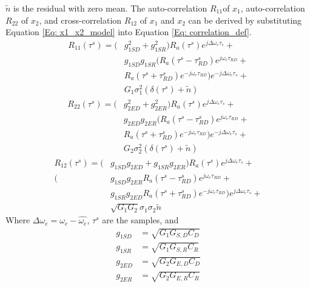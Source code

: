 \documentclass[draftcls,onecolumn]{IEEEtran}  %
\begin{document}
$\tilde{n}$ is the residual with zero mean. The auto-correlation $R_{11}$of $x_1$, auto-correlation $R_{22}$ of $x_2$, and cross-correlation $R_{12}$ of $x_1$ and $x_2$ can be derived by substituting Equation \ref{Eq: x1_x2_model} into Equation \ref{Eq: correlation_def}.
\begin{equation}
\begin{split}
	R_{11}(\tau^s) = (&g^2_{1SD} + g^2_{1SR})R_a(\tau^s)e^{j\Delta\omega_e\tau_s}+\\
    								 & g_{1SD} g_{1SR} (R_a(\tau^s-\tau^s_{RD})e^{j\omega_e \tau_{RD}}+\\ &R_a(\tau^s+\tau^s_{RD})e^{-j\omega_e \tau_{RD}})e^{-j\Delta\omega_e\tau_s}+\\
&G_1\sigma^2_1(\delta(\tau^s) + \tilde{n})                                     
\end{split}
\label{Eq: R11}
\end{equation}
\begin{equation}
\begin{split}
	R_{22}(\tau^s) = (&g^2_{2ED} + g^2_{2ER})R_a(\tau^s)e^{j\Delta\omega_e\tau_s}+\\
    								 & g_{2ED} g_{2ER} (R_a(\tau^s-\tau^s_{RD})e^{j\omega_e \tau_{RD}}+\\ &R_a(\tau^s+\tau^s_{RD})e^{-j\omega_e \tau_{RD}})e^{-j\Delta\omega_e\tau_s}+\\
&G_2\sigma^2_2(\delta(\tau^s) + \tilde{n})                                     
\end{split}
\label{Eq: R22}
\end{equation}
\begin{equation}
\begin{split}
	R_{12}(\tau^s) = (&g_{1SD} g_{2ED} + g_{1SR} g_{2ER})R_a(\tau^s)e^{j\Delta\omega_e\tau_s}+\\
    								 (& g_{1SD} g_{2ER} R_a(\tau^s-\tau^s_{RD})e^{j\omega_e \tau_{RD}}+\\ &g_{1SR} g_{2ED} R_a(\tau^s+\tau^s_{RD})e^{-j\omega_e \tau_{RD}})e^{j\Delta\omega_e\tau_s}+\\
&\sqrt{G_1 G_2}\sigma_1 \sigma_2 \tilde{n}                                     
\end{split}
\label{Eq: R12}
\end{equation}Where $\Delta \omega_e = \omega_e - \hat{\omega_e}$, $\tau^s$ are the samples, and 
\begin{eqnarray}
	g_{1SD} &= \sqrt{G_1 G_{S,D} C_D} \\
    g_{1SR} &= \sqrt{G_1 G_{S,R} C_R} \\
    g_{2ED} &= \sqrt{G_2 G_{E,D} C_D} \\
    g_{2ER} &= \sqrt{G_2 G_{E,R} C_R} \label{Eq:total gain}
\end{eqnarray}
\end{document}
